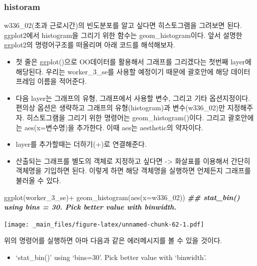 \documentclass[
]{book}
\newenvironment{Shaded}{\begin{snugshade}}{\end{snugshade}}
\newcommand{\AttributeTok}[1]{\textcolor[rgb]{0.77,0.63,0.00}{#1}}
\newcommand{\DocumentationTok}[1]{\textcolor[rgb]{0.56,0.35,0.01}{\textbf{\textit{#1}}}}
\newcommand{\FunctionTok}[1]{\textcolor[rgb]{0.00,0.00,0.00}{#1}}
\newcommand{\NormalTok}[1]{#1}
\newcommand{\SpecialCharTok}[1]{\textcolor[rgb]{0.00,0.00,0.00}{#1}}
\providecommand{\tightlist}{%
  \setlength{\itemsep}{0pt}\setlength{\parskip}{0pt}}
\theoremstyle{definition}
\theoremstyle{definition}
\theoremstyle{definition}
\theoremstyle{definition}
\theoremstyle{remark}
\begin{document}
\hypertarget{historam}{%
\subsubsection{historam}\label{historam}}

w336\_02(초과 근로시간)의 빈도분포를 알고 싶다면 히스토그램을 그려보면 된다. ggplot2에서 histogram을 그리기 위한 함수는 geom\_histogram이다. 앞서 설명한 ggplot2의 명령어구조를 떠올리며 아래 코드를 해석해보자.

\begin{itemize}
\tightlist
\item
  첫 줄은 ggplot()으로 OO데이터를 활용해서 그래프를 그리겠다는 첫번째 layer에 해당된다. 우리는 worker\_3\_se를 사용할 예정이기 때문에 괄호안에 해당 데이터프레임 이름을 적어준다.
\item
  다음 layer는 그래프의 유형, 그래프에서 사용할 변수, 그리고 기타 옵션지정이다. 편의상 옵션은 생략하고 그래프의 유형(histogram)과 변수(w336\_02)만 지정해주자. 히스토그램을 그리기 위한 명령어는 geom\_histogram()이다. 그리고 괄호안에는 aes(x=변수명)을 추가한다. 이때 aes는 aesthetic의 약자이다.
\item
  layer를 추가할때는 더하기(+)로 연결해준다.
\item
  산출되는 그래프를 별도의 객체로 지정하고 싶다면 -\textgreater{} 화살표를 이용해서 간단히 객체명을 기입하면 된다. 이렇게 하면 해당 객체명을 실행하면 언제든지 그래프를 불러올 수 있다.
\end{itemize}

\begin{Shaded}
\begin{Highlighting}[]
\FunctionTok{ggplot}\NormalTok{(worker\_3\_se)}\SpecialCharTok{+}
  \FunctionTok{geom\_histogram}\NormalTok{(}\FunctionTok{aes}\NormalTok{(}\AttributeTok{x=}\NormalTok{w336\_02))}
\DocumentationTok{\#\# \textasciigrave{}stat\_bin()\textasciigrave{} using \textasciigrave{}bins = 30\textasciigrave{}. Pick better value with \textasciigrave{}binwidth\textasciigrave{}.}
\end{Highlighting}
\end{Shaded}

\texttt{[image: \_main\_files/figure-latex/unnamed-chunk-62-1.pdf]}

위의 명령어를 실행하면 아마 다음과 같은 에러메시지를 볼 수 있을 것이다.

\begin{itemize}
\tightlist
\item
  `stat\_bin()' using `bins=30'. Pick better value with `binwidth'.
\end{itemize}
\end{document}
